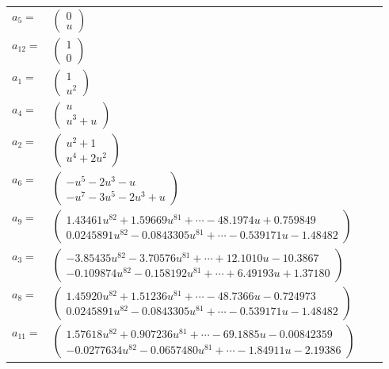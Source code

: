 \documentclass[1p]{elsarticle_modified}
\theoremstyle{definition}
\begin{document}
\begin{tabular}{m{7pt} m{180pt} m{7pt} m{180pt} }
\flushright $a_{5}=$&$\begin{pmatrix}0\\u\end{pmatrix}$ \\
\flushright $a_{12}=$&$\begin{pmatrix}1\\0\end{pmatrix}$ \\
\flushright $a_{1}=$&$\begin{pmatrix}1\\u^2\end{pmatrix}$ \\
\flushright $a_{4}=$&$\begin{pmatrix}u\\u^3+u\end{pmatrix}$ \\
\flushright $a_{2}=$&$\begin{pmatrix}u^2+1\\u^4+2 u^2\end{pmatrix}$ \\
\flushright $a_{6}=$&$\begin{pmatrix}- u^5-2 u^3- u\\- u^7-3 u^5-2 u^3+u\end{pmatrix}$ \\
\flushright $a_{9}=$&$\begin{pmatrix}1.43461 u^{82}+1.59669 u^{81}+\cdots-48.1974 u+0.759849\\0.0245891 u^{82}-0.0843305 u^{81}+\cdots-0.539171 u-1.48482\end{pmatrix}$ \\
\flushright $a_{3}=$&$\begin{pmatrix}-3.85435 u^{82}-3.70576 u^{81}+\cdots+12.1010 u-10.3867\\-0.109874 u^{82}-0.158192 u^{81}+\cdots+6.49193 u+1.37180\end{pmatrix}$ \\
\flushright $a_{8}=$&$\begin{pmatrix}1.45920 u^{82}+1.51236 u^{81}+\cdots-48.7366 u-0.724973\\0.0245891 u^{82}-0.0843305 u^{81}+\cdots-0.539171 u-1.48482\end{pmatrix}$ \\
\flushright $a_{11}=$&$\begin{pmatrix}1.57618 u^{82}+0.907236 u^{81}+\cdots-69.1885 u-0.00842359\\-0.0277634 u^{82}-0.0657480 u^{81}+\cdots-1.84911 u-2.19386\end{pmatrix}$ \\

\end{tabular}
\end{document}
